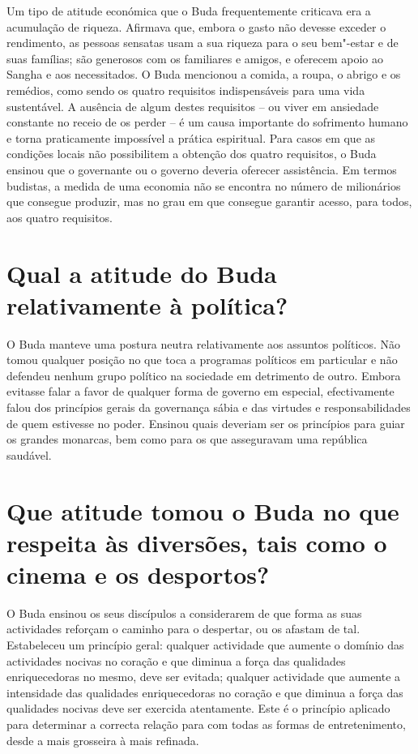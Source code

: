 Um tipo de atitude económica que o Buda frequentemente criticava era a
acumulação de riqueza. Afirmava que, embora o gasto não devesse exceder
o rendimento, as pessoas sensatas usam a sua riqueza para o seu
bem"-estar e de suas famílias; são generosos com os familiares e amigos,
e oferecem apoio ao Sangha e aos necessitados. O Buda mencionou a
comida, a roupa, o abrigo e os remédios, como sendo os quatro
requisitos indispensáveis para uma vida sustentável. A ausência de algum
destes requisitos -- ou viver em ansiedade constante no receio de os
perder -- é um causa importante do sofrimento humano e torna
praticamente impossível a prática espiritual. Para casos em que as
condições locais não possibilitem a obtenção dos quatro requisitos, o
Buda ensinou que o governante ou o governo deveria oferecer assistência.
Em termos budistas, a medida de uma economia não se encontra no número
de milionários que consegue produzir, mas no grau em que consegue
garantir acesso, para todos, aos quatro requisitos.

\section{Qual a atitude do Buda relativamente à política?}

O Buda manteve uma postura neutra relativamente aos assuntos políticos.
Não tomou qualquer posição no que toca a programas políticos em
particular e não defendeu nenhum grupo político na sociedade em
detrimento de outro. Embora evitasse falar a favor de qualquer forma de
governo em especial, efectivamente falou dos princípios gerais da
governança sábia e das virtudes e responsabilidades de quem estivesse no
poder. Ensinou quais deveriam ser os princípios para guiar os grandes
monarcas, bem como para os que asseguravam uma república saudável.

\section{Que atitude tomou o Buda no que respeita às diversões, tais como o
  cinema e os desportos?}

O Buda ensinou os seus discípulos a considerarem de que forma as suas
actividades reforçam o caminho para o despertar, ou os afastam de tal.
Estabeleceu um princípio geral: qualquer actividade que aumente o
domínio das actividades nocivas no coração e que diminua a força das
qualidades enriquecedoras no mesmo, deve ser evitada; qualquer
actividade que aumente a intensidade das qualidades enriquecedoras no
coração e que diminua a força das qualidades nocivas deve ser exercida
atentamente. Este é o princípio aplicado para determinar a correcta
relação para com todas as formas de entretenimento, desde a mais
grosseira à mais refinada.

